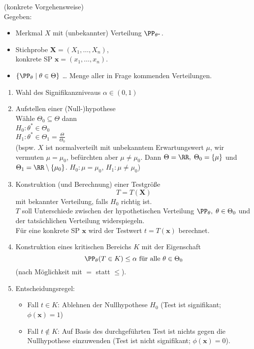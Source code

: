  (konkrete Vorgehensweise)\\
Gegeben:
\begin{itemize}
\item Merkmal $X$ mit (unbekannter) Verteilung $\PP_{\theta^*}$.
\item Stichprobe $\mathbf{X} = (X_1, \ldots, X_n)$, \\
konkrete SP $\mathbf{x}=(x_1, \ldots, x_n)$.
\item $\{\PP_\theta \;|\; \theta \in \Theta\}$ … Menge aller in Frage kommenden Verteilungen.
\end{itemize}
\begin{enumerate}
\item Wahl des Signifikanzniveaus $\alpha \in (0,1)$
\item Aufstellen einer (Null-)hypothese\\
Wähle $\Theta_0 \subseteq \Theta$ dann \\
$H_0: \theta^* \in \Theta_0$ \\
$H_1: \theta^* \in \Theta_1 = \frac{\Theta}{\Theta_0}$\\
(bspw. $X$ ist normalverteilt mit unbekanntem Erwartungswert $\mu$, wir vermuten $\mu = \mu_0$, befürchten aber $\mu \not = \mu_0$. Dann $\Theta = \RR, \; \Theta_0 =\{\mu\}$ und $\Theta_1 = \RR\setminus \{\mu_0\}$. $H_0: \mu=\mu_0$, $H_1: \mu \not = \mu_0$)
\item Konstruktion (und Berechnung) einer Testgröße
$$T=T(\mathbf{X})$$
mit bekannter Verteilung, falls $H_0$ richtig ist.\\
$T$ soll Unterschiede zwischen der hypothetischen Verteilung $\PP_\theta, \; \theta \in \Theta_0$ und der tatsächlichen Verteilung widerspiegeln.\\
Für eine konkrete SP $\mathbf{x}$ wird der Testwert $t=T(\mathbf{x})$ berechnet.
\item Konstruktion eines kritischen Bereichs $K$ mit der Eigenschaft
$$\PP_\theta (T\in K) \leq \alpha \text{ für alle }\theta \in \Theta_0$$
(nach Möglichkeit mit $=$ statt $\leq $).
\item Entscheidungsregel:
\begin{itemize}
\item Fall $t\in K$: Ablehnen der Nullhypothese $H_0$ (Test ist signifikant; $\phi(\mathbf{x})=1$)
\item Fall $t \not \in K$: Auf Basis des durchgeführten Test ist nichts gegen die Nullhypothese einzuwenden (Test ist nicht signifikant; $\phi(\mathbf{x})=0$).
\end{itemize}
\end{enumerate}

